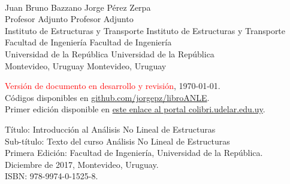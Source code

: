 \documentclass[spanish,twoside,openright,10pt]{book}
\begin{document}
~
\vspace{5mm}
\singlespacing


  \noindent
{\sffamily Juan Bruno Bazzano \hfill Jorge Pérez Zerpa\\
	{\footnotesize 	Profesor Adjunto \hfill Profesor Adjunto\\
		Instituto de Estructuras y Transporte  \hfill Instituto de Estructuras y Transporte\\
		Facultad de Ingeniería \hfill Facultad de Ingeniería\\
		Universidad de la República \hfill Universidad de la República\\
		Montevideo, Uruguay \hfill Montevideo, Uruguay}}\\[0.5cm]


\vspace{20mm}

\noindent
\textcolor{red}{
Versión de documento en desarrollo y revisión}, \today.\\
Códigos disponibles en \href{https://github.com/jorgepz/libroANLE}{github.com/jorgepz/libroANLE}.\\[1cm]

\noindent
Primer edición disponible en 
\href{https://www.colibri.udelar.edu.uy/jspui/bitstream/20.500.12008/22106/1/Bazzano_P%c3%a9rezZerpa_Introducci%c3%b3n_al_An%c3%a1lisis_No_Lineal_de_Estructuras_2017.pdf}{este enlace al portal colibri.udelar.edu.uy}.

\noindent
Título: Introducción al Análisis No Lineal de Estructuras\\
\noindent
Sub-título: Texto del curso Análisis No Lineal de Estructuras\\[-2mm]

\noindent
Primera Edición: Facultad de Ingeniería, Universidad de la República.\\
Diciembre de 2017, Montevideo, Uruguay.\\
ISBN: 978-9974-0-1525-8.\\
\end{document}
